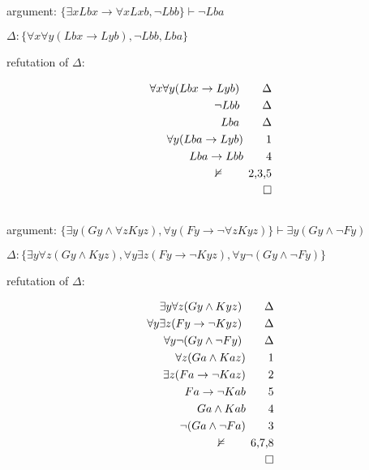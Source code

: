 \documentclass[a4paper,11pt]{article}
\begin{document}

\subsection{}

argument: $\{ \exists x Lbx \rightarrow \forall x Lxb, \lnot Lbb \} \vdash \lnot Lba $

\bigskip

\noindent $\Delta: \{ \forall x \forall y(Lbx \rightarrow Lyb),  \lnot Lbb, Lba \}$

\bigskip

\noindent refutation of $\Delta:$

\begin{align*} 
  \forall x \forall y(Lbx \rightarrow Lyb)        						\tag*{$\Delta$} \\
  \lnot Lbb												\tag*{$\Delta$} \\
  Lba								  		                		\tag*{$\Delta$} \\
  \forall y(Lba \rightarrow Lyb)								\tag*{1} \\
  Lba \rightarrow Lbb										\tag*{4} \\
  \nvDash												\tag*{2,3,5} \\
  \qedhere
\end{align*}


\subsection{}

argument: $\{ \exists y(Gy \land \forall z Kyz), \forall y(Fy \rightarrow \lnot \forall z Kyz) \} \vdash \exists y(Gy \land \lnot Fy) $

\bigskip

\noindent $\Delta: \{ \exists y \forall z(Gy \land Kyz), \forall y \exists z(Fy \rightarrow \lnot Kyz), \forall y \lnot(Gy \land \lnot Fy) \} $

\bigskip

\noindent refutation of $\Delta:$

\begin{align*} 
  \exists y \forall z(Gy \land Kyz)         						\tag*{$\Delta$} \\
  \forall y \exists z(Fy \rightarrow \lnot Kyz)						\tag*{$\Delta$} \\
  \forall y \lnot(Gy \land \lnot Fy)								\tag*{$\Delta$} \\
  \forall z(Ga \land Kaz)									\tag*{1} \\
  \exists z(Fa \rightarrow \lnot Kaz)							\tag*{2} \\
  Fa \rightarrow \lnot Kab									\tag*{5} \\
  Ga \land Kab											\tag*{4} \\
  \lnot(Ga \land \lnot Fa)									\tag*{3} \\
  \nvDash												\tag*{6,7,8} \\
  \qedhere
\end{align*}
\end{document}
